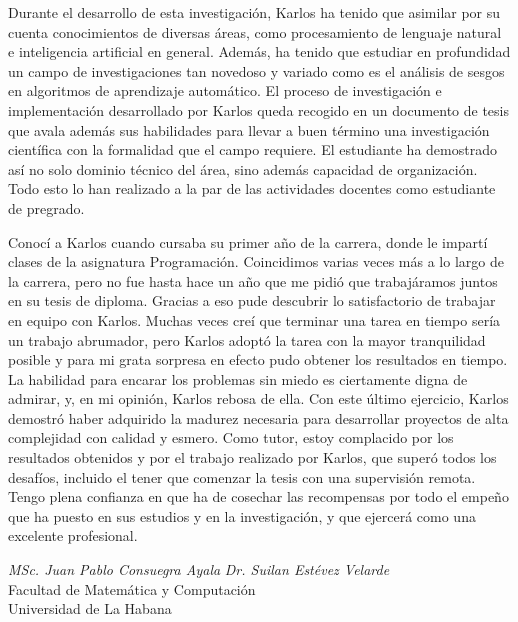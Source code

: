 \begin{opinion}
Durante el desarrollo de esta investigación, Karlos ha tenido que asimilar por su cuenta conocimientos de diversas áreas, como procesamiento de lenguaje natural e inteligencia artificial en general. Además, ha tenido que estudiar en profundidad un campo de investigaciones tan novedoso y variado como es el análisis de sesgos en algoritmos de aprendizaje automático. El proceso de investigación e implementación desarrollado por Karlos queda recogido en un documento de tesis que avala además sus habilidades para llevar a buen término una investigación científica con la formalidad que el campo requiere. El estudiante ha demostrado así no solo dominio técnico del área, sino además capacidad de organización.  Todo esto lo han realizado a la par de las actividades docentes como estudiante de pregrado.

Conocí a Karlos cuando cursaba su primer año de la carrera, donde le impartí clases de la asignatura Programación. Coincidimos varias veces más a lo largo de la carrera, pero no fue hasta hace un año que me pidió que trabajáramos juntos en su tesis de diploma. Gracias a eso pude descubrir lo satisfactorio de trabajar en equipo con Karlos. Muchas veces creí que terminar una tarea en tiempo sería un trabajo abrumador, pero Karlos adoptó la tarea con la mayor tranquilidad posible y para mi grata sorpresa en efecto pudo obtener los resultados en tiempo. La habilidad para encarar los problemas sin miedo es ciertamente digna de admirar, y, en mi opinión, Karlos rebosa de ella. Con este último ejercicio, Karlos demostró haber adquirido la madurez necesaria para desarrollar proyectos de alta complejidad con calidad y esmero. Como tutor, estoy complacido por los resultados obtenidos y por el trabajo realizado por Karlos, que superó todos los desafíos, incluido el tener que comenzar la tesis con una supervisión remota. Tengo plena confianza en que ha de cosechar las recompensas por todo el empeño que ha puesto en sus estudios y en la investigación, y que ejercerá como una excelente profesional.

    
\vspace{1cm}

\begin{center}
\emph{MSc. Juan Pablo Consuegra Ayala} \hspace{15pt} \emph{Dr. Suilan Estévez Velarde}\\
    Facultad de Matemática y Computación \\
    Universidad de La Habana    
\end{center}

\end{opinion}